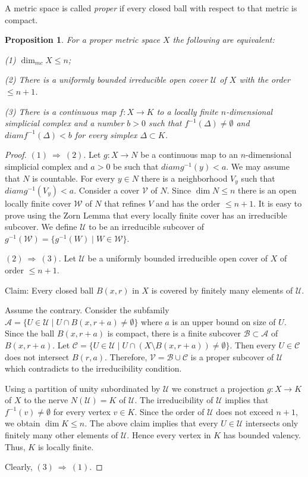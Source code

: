 \documentclass[12pt]{amsart}
\theoremstyle{plain}
\newtheorem{prop}[thm]{Proposition}
\theoremstyle{definition}
\begin{document}
A metric space is called {\em proper} if every closed ball with respect to that metric is compact.

\begin{prop}\label{md-charact}
For a proper  metric space $X$ the following are equivalent:

(1) $\dim_{mc}X\le n$;

(2) There is a uniformly bounded irreducible open cover $\mathcal U$ of $X$ with the order $\le n+1$.

(3) There is a continuous map $f:X\to K$ to a locally finite $n$-dimensional simplicial complex and a number $b>0$ such that 
$f^{-1}(\Delta)\ne\emptyset$ and $diam f^{-1}(\Delta)< b$ for every simplex $\Delta\subset K$.
\end{prop}
\begin{proof}
$(1) \ \Rightarrow \ (2)$. 
Let $g:X\to N$  be a continuous map to an $n$-dimensional simplicial complex and $a>0$ be such that
$diam g^{-1}(y)< a$.  We may assume that $N$ is countable.  For every $y\in N$ there is a neighborhood $V_y$ such that $diam g^{-1}(V_y)<a$. Consider a cover $\mathcal V$ of $N$.
Since $\dim N\le n$ there is an open locally finite cover $\mathcal W$ of $N$ that refines $V$ and has the order $\le n+1$.
It is easy to prove using the Zorn Lemma that every locally finite cover has an irreducible subcover.
We define $\mathcal U$ to be an irreducible subcover of $g^{-1}(\mathcal W)=\{g^{-1}(W)\mid W\in\mathcal W\}$.

$(2) \ \Rightarrow \ (3)$. Let $\mathcal U$ be a uniformly bounded irreducible open cover of $X$ of order $\le n+1$.

Claim: Every  closed ball $B(x,r)$ in $X$ is covered by finitely many elements of $\mathcal U$. 

Assume the contrary. Consider the subfamily $\mathcal A=\{U\in\mathcal U\mid U\cap B(x,r+a)\ne\emptyset\}$ where $a$ is an upper bound on size of $U$. Since the ball $B(x,r+a)$ is compact, there is a finite subcover $\mathcal B\subset\mathcal A$ of $B(x,r+a)$.
Let  $\mathcal C=\{U\in\mathcal U\mid U\cap (X\setminus B(x,r+a))\ne\emptyset\}$. Then every $U\in\mathcal  C$ does not intersect
$B(r,a)$. Therefore, $\mathcal V=\mathcal B\cup\mathcal C$ is a proper subcover of $\mathcal U$ which contradicts to the irreducibility condition.

Using a partition of unity subordinated by $\mathcal U$ we construct a projection $g:X\to K$ of $X$ to the nerve
$N(\mathcal U)=K$ of $\mathcal U$. The irreducibility of $\mathcal U$ implies that $f^{-1}(v)\ne\emptyset$ for every vertex $v\in K$.
Since the order of $\mathcal U$ does not exceed $n+1$, we obtain $\dim K\le n$. The above claim implies that every 
$U\in\mathcal U$ intersects only finitely many other elements of $\mathcal U$. Hence every vertex in $K$
has bounded valency. Thus, $K$ is locally finite.

Clearly, $(3) \ \Rightarrow \ (1)$.
\end{proof}
\end{document}
